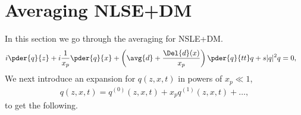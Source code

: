 \section{Averaging NLSE+DM}
In this section we go through the averaging for NSLE+DM.
\begin{equation}
\begin{split}
i \pder{q}{z} &+ i\frac{1}{x_p} \pder{q}{x} + \left(\avg{d} + \frac{\Del{d}(x)}{x_p}\right) \pder{q}{tt}q + s |q|^2 q  = 0, 
\end{split}
\end{equation}
We next introduce an expansion for $q(z,x,t)$ in powers of $x_p\ll1$,
\begin{equation}\label{equ:CGLE+DM_MS}
\begin{split}
q(z,x,t) = q^{(0)}(z,x,t) + x_p q^{(1)}(z,x,t) + \dots,
\end{split}
\end{equation}
to get the following.
